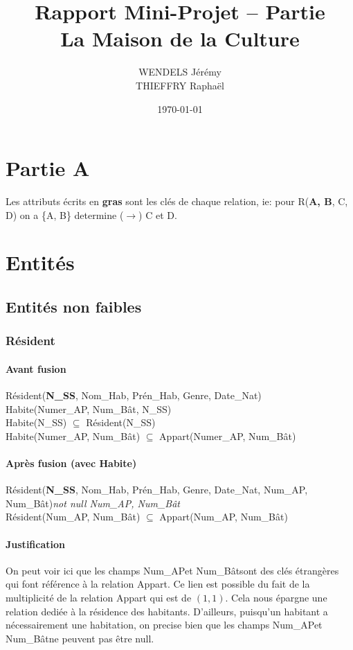\documentclass[a4paper, 12pt]{article}
\title{
    \Large Rapport Mini-Projet – Partie \uppercase\expandafter{\romannumeral 2}\\
    \textbf{La Maison de la Culture}
}
\author{
    WENDELS Jérémy \\
    THIEFFRY Raphaël
}
\affil{Université Paris-Saclay - UFR des Sciences}
\date{\today}
\begin{document}
    \maketitle
    \tableofcontents

    \newpage


    \section*{Partie A}
    Les attributs écrits en \textbf{gras} sont les clés de chaque relation, ie: pour R(\textbf{A, B}, C, D) on a \{A, B\} determine ($\rightarrow$) C et D.
    \section{Entités}
        \subsection{Entités non faibles}
            \subsubsection{Résident}
                \paragraph*{Avant fusion} Résident(\textbf{N\_SS}, Nom\_Hab, Prén\_Hab, Genre, Date\_Nat) \\
                Habite(Numer\_AP, Num\_Bât, N\_SS) \\
                Habite(N\_SS) $\subseteq$ Résident(N\_SS) \\
                Habite(Numer\_AP, Num\_Bât) $\subseteq$ Appart(Numer\_AP, Num\_Bât)
                \paragraph*{Après fusion (avec Habite)} Résident(\textbf{N\_SS}, Nom\_Hab, Prén\_Hab, Genre, Date\_Nat, Num\_AP, Num\_Bât)\textit{not null Num\_AP, Num\_Bât} \\
                Résident(Num\_AP, Num\_Bât) $\subseteq$ Appart(Num\_AP, Num\_Bât)
                
                \paragraph{Justification} On peut voir ici que les champs \og Num\_AP\fg et \og Num\_Bât\fg sont des clés étrangères qui font référence à la relation Appart. Ce lien est possible du fait de la multiplicité de la relation Appart qui est de $(1,1)$. Cela nous épargne une relation dediée à la résidence des habitants. D'ailleurs, puisqu'un habitant a nécessairement une habitation, on precise bien que les champs \og Num\_AP\fg et \og Num\_Bât\fg ne peuvent pas être null.
                
\end{document}
